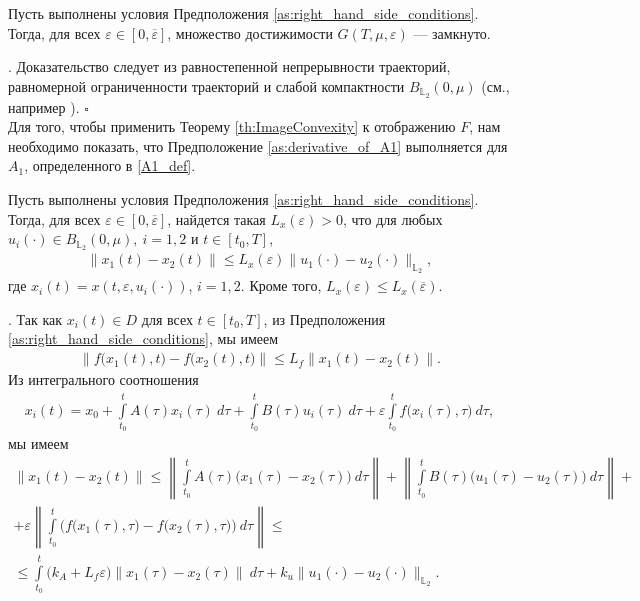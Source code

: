 \documentclass[../main.tex]{subfiles}
\begin{document}
\begin{utv}\label{ReachableSetcloseness}
	Пусть выполнены условия Предположения \ref{as:right_hand_side_conditions}. Тогда, для всех $\varepsilon\in [0,\overline{\varepsilon}]$, множество достижимости $G(T,\mu,\varepsilon) $ --- замкнуто.
\end{utv}
\doc. 
Доказательство следует из равностепенной непрерывности траекторий, равномерной ограниченности траекторий и слабой компактности $B_{\mathbb{L}_2}(0,\mu)$ (см., например \cite{GusZyk}).
\hfill$\square$\\[1ex]%

Для того, чтобы применить Теорему \ref{th:ImageConvexity} к отображению $F$,  нам необходимо показать, что Предположение \ref{as:derivative_of_A1} выполняется для $A_1$, определенного в \eqref{A1_def}.
\begin{lemma}\label{lem:Lipx}
	Пусть выполнены условия Предположения \ref{as:right_hand_side_conditions}. Тогда, для всех $\varepsilon\in [0,\overline{\varepsilon}]$, найдется такая $L_x(\varepsilon) > 0$, что для любых $u_i(\cdot) \in B_{\mathbb{L}_2}(0,\mu), \ i = 1,2$ и $t \in [t_0,T]$, 
	\begin{gather*}
		\| x_1(t) - x_2(t) \| \leqslant L_x(\varepsilon) \| u_1(\cdot) - u_2(\cdot) \|_{\mathbb{L}_2},
	\end{gather*}
	где $x_i(t) = x(t,\varepsilon,u_i(\cdot))$, $i = 1,2$. Кроме того, $L_x(\varepsilon) \leqslant L_x(\overline{\varepsilon})$. 
\end{lemma}
\doc.
Так как $x_i(t) \in D$ для всех $t\in [t_0,T]$, из Предположения \ref{as:right_hand_side_conditions}, мы имеем
\begin{gather*}
	\|f\big(x_1(t),t\big) - f\big(x_2(t),t\big)\| \leqslant L_f\|x_1(t) -  x_2(t)\|.
\end{gather*}
Из интегрального соотношения
\begin{gather}\label{nonlinear_solution}
	x_i(t) = x_0 + \int\limits_{t_0}^t A(\tau)x_i(\tau)\ d\tau + \int\limits_{t_0}^t B(\tau)u_i(\tau)\ d\tau+
	\varepsilon\int\limits_{t_0}^t f\big(x_i(\tau),\tau\big)\ d\tau,
\end{gather}
мы имеем
\begin{gather*}
	\| x_1(t) - x_2(t) \| \leqslant
	\left\| \int\limits_{t_0}^t A(\tau)\big(x_1(\tau) - x_2(\tau)\big)\ d\tau \right\| + 
	\left\|\int\limits_{t_0}^t B(\tau) \big(u_1(\tau) - u_2(\tau)\big)\ d\tau   \right\| + \\ +
	\varepsilon \left\| \int\limits_{t_0}^t \Big( f\big(x_1(\tau),\tau\big) - f\big(x_2(\tau),\tau\big) \Big)\ d\tau   \right\|  
	\leqslant \\ \leqslant
	\int\limits_{t_0}^t \big(k_A + L_f \varepsilon) \left\| x_1(\tau) - x_2(\tau)\right\| \ d\tau + k_u \| u_1(\cdot) - u_2(\cdot) \|_{\mathbb{L}_2}.
\end{gather*}
\end{document}
